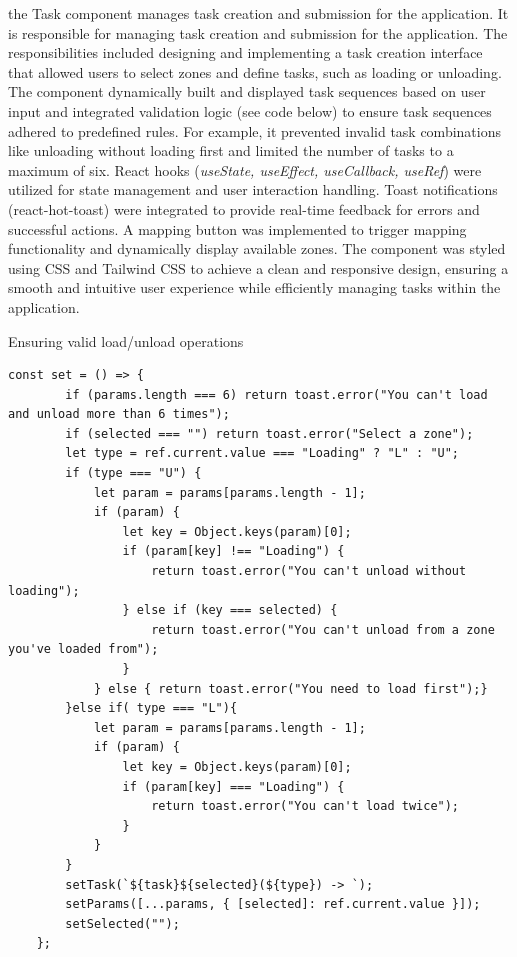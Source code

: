 \documentclass[../../main]{subfiles}
\begin{document}
the Task component manages task creation and submission for the
application. It is responsible for managing task creation and submission
for the application. The responsibilities included designing and
implementing a task creation interface that allowed users to select
zones and define tasks, such as loading or unloading. The component
dynamically built and displayed task sequences based on user input and
integrated validation logic (see code below) to ensure task sequences
adhered to predefined rules. For example, it prevented invalid task
combinations like unloading without loading first and limited the number
of tasks to a maximum of six. React hooks (\emph{useState, useEffect,
useCallback, useRef}) were utilized for state management and user
interaction handling. Toast notifications (react-hot-toast) were
integrated to provide real-time feedback for errors and successful
actions. A mapping button was implemented to trigger mapping
functionality and dynamically display available zones. The component was
styled using CSS and Tailwind CSS to achieve a clean and responsive
design, ensuring a smooth and intuitive user experience while
efficiently managing tasks within the application.
\begin{codebox}[]{Ensuring valid load/unload operations}
  
  \begin{verbatim}
const set = () => {
        if (params.length === 6) return toast.error("You can't load and unload more than 6 times");
        if (selected === "") return toast.error("Select a zone");
        let type = ref.current.value === "Loading" ? "L" : "U";
        if (type === "U") {
            let param = params[params.length - 1];
            if (param) {
                let key = Object.keys(param)[0];
                if (param[key] !== "Loading") {
                    return toast.error("You can't unload without loading");
                } else if (key === selected) {
                    return toast.error("You can't unload from a zone you've loaded from");
                }
            } else { return toast.error("You need to load first");}
        }else if( type === "L"){
            let param = params[params.length - 1];
            if (param) {
                let key = Object.keys(param)[0];
                if (param[key] === "Loading") {
                    return toast.error("You can't load twice");
                }
            }
        }
        setTask(`${task}${selected}(${type}) -> `);
        setParams([...params, { [selected]: ref.current.value }]);
        setSelected("");
    };
\end{verbatim}
\end{codebox}
\end{document}
